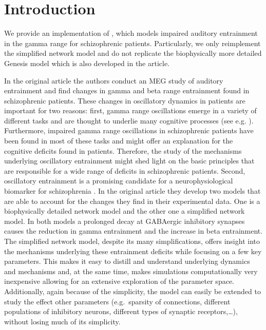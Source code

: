 \documentclass[10pt,a4paper,onecolumn]{article}
\begin{document}
\section{Introduction}\label{introduction}

We provide an implementation of \autocite{Vierling2008}, which models
impaired auditory entrainment in the gamma range for schizophrenic
patients. Particularly, we only reimplement the simplified network model
and do not replicate the biophysically more detailed Genesis model which
is also developed in the article.

In the original article the authors conduct an MEG study of auditory
entrainment and find changes in gamma and beta range entrainment found
in schizophrenic patients. These changes in oscillatory dynamics in
patients are important for two reasons: first, gamma range oscillations
emerge in a variety of different tasks and are thought to underlie many
cognitive processes (see e.g. \autocite{Fries2005,Fries2015}). Furthermore, impaired gamma
range oscillations in schizophrenic patients have been found in most of
these tasks and might offer an explanation for the cognitive deficits
found in patients. Therefore, the study of the mechanisms underlying
oscillatory entrainment might shed light on the basic principles that
are responsible for a wide range of deficits in schizophrenic patients.
Second, oscillatory entrainment is a promising candidate for a
neurophysiological biomarker for schizophrenia
\autocite{Siekmeier2015}. In the original article they develop two
models that are able to account for the changes they find in their
experimental data. One is a biophysically detailed network model and the
other one a simplified network model. In both models a prolonged decay
at GABAergic inhibitory synapses causes the reduction in gamma
entrainment and the increase in beta entrainment. The simplified network
model, despite its many simplifications, offers insight into the
mechanisms underlying these entrainment deficits while focusing on a few
key parameters. This makes it easy to distill and understand underlying
dynamics and mechanisms and, at the same time, makes simulations
computationally very inexpensive allowing for an extensive exploration
of the parameter space. Additionally, again because of the simplicity,
the model can easily be extended to study the effect other parameters
(e.g.~sparsity of connections, different populations of inhibitory
neurons, different types of synaptic receptors,\ldots{}), without
losing much of its simplicity.
\end{document}

